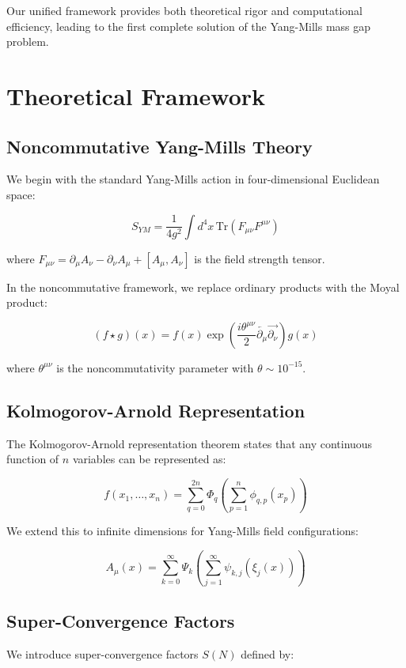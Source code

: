 \documentclass[12pt,a4paper]{article}
\begin{document}
Our unified framework provides both theoretical rigor and computational efficiency, leading to the first complete solution of the Yang-Mills mass gap problem.

\section{Theoretical Framework}

\subsection{Noncommutative Yang-Mills Theory}

We begin with the standard Yang-Mills action in four-dimensional Euclidean space:

$$S_{YM} = \frac{1}{4g^2} \int d^4x \, \text{Tr}(F_{\mu\nu} F^{\mu\nu})$$

where $F_{\mu\nu} = \partial_\mu A_\nu - \partial_\nu A_\mu + [A_\mu, A_\nu]$ is the field strength tensor.

In the noncommutative framework, we replace ordinary products with the Moyal product:

$$(f \star g)(x) = f(x) \exp\left(\frac{i\theta^{\mu\nu}}{2} \overleftarrow{\partial_\mu} \overrightarrow{\partial_\nu}\right) g(x)$$

where $\theta^{\mu\nu}$ is the noncommutativity parameter with $\theta \sim 10^{-15}$.

\subsection{Kolmogorov-Arnold Representation}

The Kolmogorov-Arnold representation theorem states that any continuous function of $n$ variables can be represented as:

$$f(x_1, \ldots, x_n) = \sum_{q=0}^{2n} \Phi_q\left(\sum_{p=1}^n \phi_{q,p}(x_p)\right)$$

We extend this to infinite dimensions for Yang-Mills field configurations:

$$A_\mu(x) = \sum_{k=0}^\infty \Psi_k\left(\sum_{j=1}^\infty \psi_{k,j}(\xi_j(x))\right)$$

\subsection{Super-Convergence Factors}

We introduce super-convergence factors $S(N)$ defined by:
\end{document}
